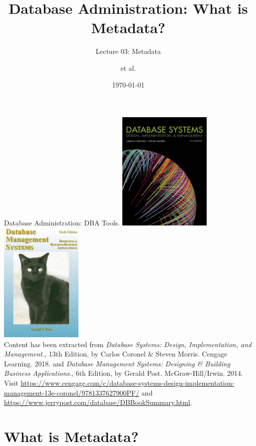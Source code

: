 \documentclass{beamer}
\title[Metadata]{Database Administration: What is Metadata?}
\subtitle{Lecture 03: Metadata}
\author{et al.}
\date{\today}
\begin{document}
\frame{\titlepage}

\begin{frame}{Database Administration: DBA Tools.}
    \centering
    \includegraphics[width=0.34\textwidth]{figures/book_cover2.jpg}
    \includegraphics[width=0.3\textwidth]{figures/book_cover3.jpg} \\
    \vspace{5mm}
    {
        \tiny
        Content has been extracted from \textit{Database Systems: Design, Implementation, and Management.}, 13th Edition, by Carlos Coronel \& Steven Morris. Cengage Learning. 2018. and \textit{Database Management Systems: Designing \& Building Business Applications.}, 6th Edition, by Gerald Post. McGraw-Hill/Irwin. 2014. \\
        Visit \url{https://www.cengage.com/c/database-systems-design-implementation-management-13e-coronel/9781337627900PF/} and \url{https://www.jerrypost.com/database/DBBookSummary.html}.\\
    }
\end{frame}

\section{What is Metadata?}
\end{document}
